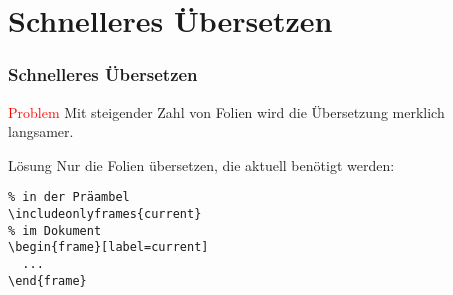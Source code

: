 \section{Schnelleres Übersetzen}
\begin{slide}
  \frametitle{Schnelleres Übersetzen}

  \onslide<+->

  \begin{block}{\textcolor{red}{Problem}}
    Mit steigender Zahl von Folien wird die Übersetzung merklich langsamer.
  \end{block}

  \onslide<+->

  \begin{block}{\textcolor{green!50!black}{Lösung}}
    Nur die Folien übersetzen, die aktuell benötigt werden:
\begin{lstlisting}
% in der Präambel
\includeonlyframes{current}
% im Dokument
\begin{frame}[label=current]
  ...
\end{frame}
\end{lstlisting}
  \end{block}

\end{slide}













